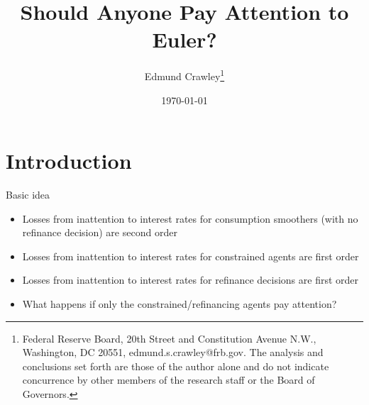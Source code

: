 \documentclass[AER]{AEA}
\begin{document}
\title{Should Anyone Pay Attention to Euler?}
\author{Edmund Crawley\thanks{ Federal Reserve Board, 20th Street and Constitution Avenue N.W., Washington, DC 20551, edmund.s.crawley@frb.gov. The analysis and conclusions set forth are those of the author alone and do not indicate concurrence by other members of the research staff or the Board of Governors.}}
\date{\today}
\pubMonth{}
\pubYear{}
\pubVolume{}
\pubIssue{}
\JEL{}

\begin{abstract}

\end{abstract}


\maketitle

\newpage
\section{Introduction}
Basic idea
\begin{itemize}
\item Losses from inattention to interest rates for consumption smoothers (with no refinance decision) are second order
\item Losses from inattention to interest rates for constrained agents are first order
\item Losses from inattention to interest rates for refinance decisions are first order
\item What happens if only the constrained/refinancing agents pay attention?
\end{itemize}
\end{document}
